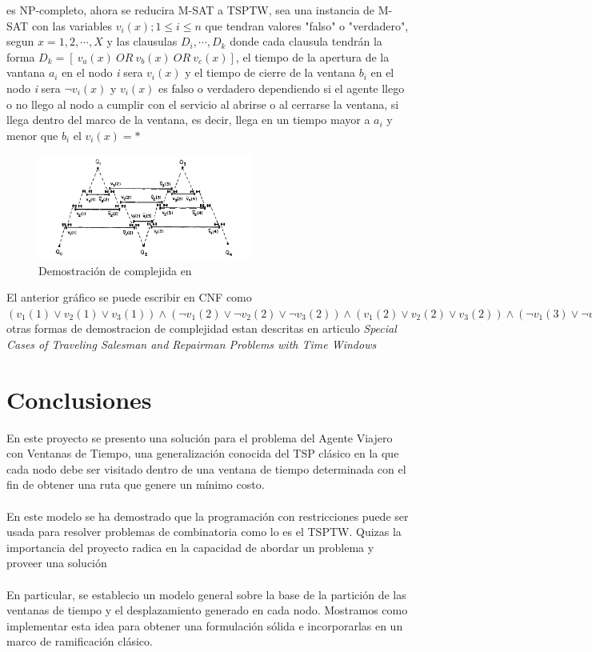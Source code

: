 \documentclass[journal, a4paper]{IEEEtran}
\begin{document}
es NP-completo, ahora se reducira M-SAT a TSPTW, sea una instancia de M-SAT con las variables
\( v_{i}(x); 1 \leq i \leq n\) que tendran valores "falso" o "verdadero", segun \( x = 1,2,\cdots,X\)
y las clausulas \( D_{i}, \cdots ,D_{k} \) donde cada clausula tendr\'an la forma
\(D_{k}=\left [\> v_{a}(x)\>OR\> v_{b}(x)\>OR\>v_{c}(x) \right ]\), el tiempo de la apertura de la vantana
\( a_{i} \) en el nodo \textit{i} sera \( v_{i}(x)\) y el tiempo de cierre de la ventana \( b_{i} \)
en el nodo \textit{i} sera \( \neg v_{i}(x)\) y \( v_{i}(x)\) es falso o verdadero dependiendo si el 
agente llego o no llego al nodo a cumplir con el servicio al abrirse o al cerrarse la ventana, si llega
dentro del marco de la ventana, es decir, llega en un tiempo mayor a \( a_{i} \) y menor que \( b_{i} \)
el \( v_{i}(x) = * \)
\begin{figure}[H]
\centering
  \includegraphics[width=70mm]{complex.jpg}
  \caption{Demostraci\'on de complejida en \cite{TSPTWCOMPLEX}}
  \label{demostracion de complejidad}
\end{figure}

El anterior gr\'afico se puede escribir en CNF como 
\( ( v_{1}(1) \lor v_{2}(1) \lor v_{3}(1)) \land ( \neg v_{1}(2) \lor \neg v_{2}(2) \lor \neg v_{3}(2)) \land ( v_{1}(2) \lor v_{2}(2) \lor v_{3}(2)) \land ( \neg v_{1}(3) \lor \neg v_{2}(3) \lor \neg v_{3}(3)) \land ( v_{1}(3) \lor v_{2}(3) \lor v_{3}(3)) \land ( v_{1}(4) \lor v_{2}(4) \lor v_{3}(4)) \) 
otras formas de demostracion de complejidad estan descritas en articulo \textit{Special Cases of Traveling Salesman and Repairman Problems with Time Windows} \cite{TSPTWCOMPLEX}

\section{Conclusiones}
En este proyecto se presento una soluci\'on para el problema del Agente Viajero con Ventanas de Tiempo, 
una generalizaci\'on conocida del TSP cl\'asico en la que cada nodo debe ser visitado dentro de una ventana 
de tiempo determinada con el fin de obtener una ruta que genere un m\'inimo costo.\\ 
\\En este modelo se ha demostrado que la programaci\'on con restricciones
puede ser usada para resolver problemas de combinatoria como lo es el 
TSPTW. Quizas la importancia del proyecto radica en la capacidad de abordar
un problema y proveer una soluci\'on\\ 
\\En particular, se establecio un modelo general sobre la base de la partici\'on
de las ventanas de tiempo y el desplazamiento generado en cada nodo. 
Mostramos como implementar esta idea para obtener una formulaci\'on s\'olida e
incorporarlas en un marco de ramificaci\'on cl\'asico.\\
\end{document}
